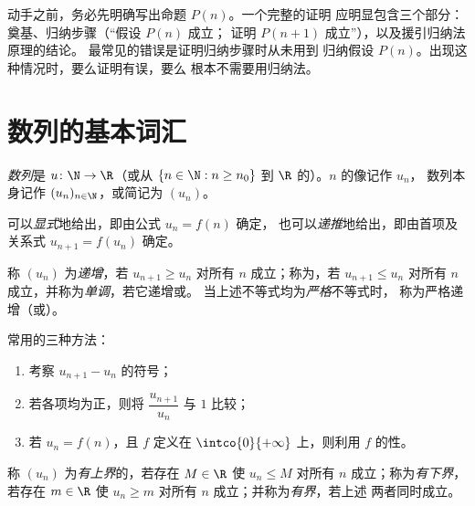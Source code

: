 \begin{method}[归纳法证明的写法]\label{met:g12:seq:induction}
动手之前，务必先明确写出命题 $P(n)$。一个完整的证明
应明显包含三个部分：奠基、归纳步骤（“假设 $P(n)$ 成立；
证明 $P(n+1)$ 成立”），以及援引归纳法原理的结论。
最常见的错误是证明归纳步骤时从未用到
归纳假设 $P(n)$。出现这种情况时，要么证明有误，要么
根本不需要用归纳法。
\end{method}

\section{数列的基本词汇}

\begin{definition}[数列]\label{def:g12:seq:sequence}
\emph{数列}是 $u \colon \N \to \R$（或从
$\{n \in \N : n \geq n_0\}$ 到 $\R$ 的）。$n$ 的像记作 $u_n$，
数列本身记作 $(u_n)_{n\in\N}$，或简记为 $(u_n)$。
\end{definition}

可以\emph{显式}地给出，即由公式 $u_n = f(n)$ 确定，
也可以\emph{递推}地给出，即由首项及关系式 $u_{n+1} = f(u_n)$ 确定。

\begin{definition}[单调性]\label{def:g12:seq:monotonic}
称 $(u_n)$ 为\emph{递增}，若
$u_{n+1} \geq u_n$ 对所有 $n$ 成立；称为\emph{}，若
$u_{n+1} \leq u_n$ 对所有 $n$ 成立，并称为\emph{单调}，若它递增或。
当上述不等式均为\emph{严格}不等式时，
称为严格递增（或）。
\end{definition}

\begin{method}[研究数列单调性的方法]\label{met:g12:seq:monotonicity}
常用的三种方法：
\begin{enumerate}
  \item 考察 $u_{n+1} - u_n$ 的符号；
  \item 若各项均为正，则将 $\dfrac{u_{n+1}}{u_n}$ 与 $1$ 比较；
  \item 若 $u_n = f(n)$，且 $f$ 定义在 $\intco{0}{+\infty}$ 上，则利用
        $f$ 的性。
\end{enumerate}
\end{method}

\begin{definition}[有界数列]\label{def:g12:seq:bounded}
称 $(u_n)$ 为\emph{有上界}的，若存在
$M \in \R$ 使 $u_n \leq M$ 对所有 $n$ 成立；称为\emph{有下界}，若存在
$m \in \R$ 使 $u_n \geq m$ 对所有 $n$ 成立；并称为\emph{有界}，若上述
两者同时成立。
\end{definition}

